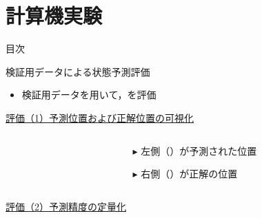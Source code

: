 \section{計算機実験}

\begin{frame}[noframenumbering]{目次}
    \tableofcontents[currentsection]
\end{frame}

\begin{frame}{検証用データによる状態予測評価}
    \small
    \begin{itemize}
        \item 検証用データを用いて，を評価
    \end{itemize}
    \vspace{0.5zh}
    \uline{評価（1）予測位置および正解位置の可視化}
    \begin{columns}
        \begin{column}{.6\linewidth}
            \vspace{-1zh}
        \end{column}
        \hspace{-30pt}
        \begin{column}{.4\linewidth}
            \begin{itemize}
                \item[$\blacktriangleright$] 左側（）が予測された位置
                \item[$\blacktriangleright$] 右側（）が正解の位置
            \end{itemize}
        \end{column}
    \end{columns}
    \uline{評価（2）予測精度の定量化}
    \begin{columns}
        \begin{column}{.6\linewidth}
        \end{column}
        \hspace{-30pt}
        \begin{column}{.4\linewidth}
            \vspace{-2.5zh}
            \begin{itemize}

\end{itemize}
\end{column}
\end{columns}
\end{frame}
